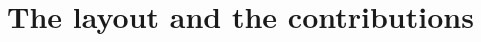 \documentclass[twoside,11pt]{book}
\newtheorem{theorem}{Theorem}
\numberwithin{theorem}{chapter}
\numberwithin{definition}{chapter}
\numberwithin{proposition}{chapter}
\numberwithin{corollary}{chapter}
\numberwithin{example}{chapter}
\numberwithin{lemma}{chapter}
\numberwithin{assumption}{chapter}
\numberwithin{equation}{chapter}
\numberwithin{figure}{chapter}
\DeclareMathOperator{\Det}{Det}
\DeclareMathOperator{\Tran}{\intercal}
\DeclareMathOperator{\Prb}{\mathbb{P}}
\begin{document}











\section{The layout and the contributions}

\end{document}
